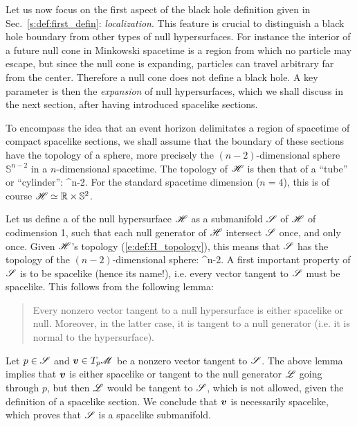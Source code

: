 Let us now focus on the first aspect of the black hole definition given
in Sec.~\ref{s:def:first_defin}: \emph{localization}.
This feature is crucial to distinguish a black hole boundary from other types
of null hypersurfaces. For instance the interior of a future null cone
in Minkowski spacetime is a region from which no particle may escape,
but since the null cone is expanding, particles can travel arbitrary far from
the center. Therefore a null cone does not define a black hole.
A key parameter is then the \emph{expansion} of null hypersurfaces, which we shall
discuss in the next section, after having introduced spacelike sections.

To encompass the idea that an event horizon delimitates a
region of spacetime of compact spacelike sections, we shall assume
that the boundary of these sections have the topology of a sphere, more
precisely the $(n-2)$-dimensional sphere $\mathbb{S}^{n-2}$ in a $n$-dimensional
spacetime. The topology of $\mathscr{H}$ is then that of a ``tube'' or ``cylinder'':
\be \label{e:def:H_topology}
    \Hor \simeq \R \times {}^{n-2}.
\ee
For the standard spacetime dimension ($n=4$), this is of course
$\mathscr{H} \simeq \mathbb{R} \times \mathbb{S}^{2}$.

Let us define a 
of the null hypersurface $\mathscr{H}$
as a submanifold $\mathscr{S}$ of $\mathscr{H}$ of codimension 1,
such that each null generator of $\mathscr{H}$ intersect $\mathscr{S}$ once, and only once.
Given $\mathscr{H}$'s topology (\ref{e:def:H_topology}), this means that $\mathscr{S}$ has the
topology of the $(n-2)$-dimensional sphere:
\be
    \Sp \simeq {}^{n-2}.
\ee
A first important property of $\mathscr{S}$ is to be spacelike (hence its name!),
i.e. every vector
tangent to $\mathscr{S}$ must be spacelike. This follows from the following lemma:
\begin{quote}
Every nonzero vector tangent to a null hypersurface is either spacelike or null.
Moreover, in the latter case, it is tangent to a null generator (i.e. it is normal
to the hypersurface).
\end{quote}
Let $p \in \mathscr{S}$ and $\bm{v}\in T_p\mathscr{M}$ be a nonzero vector tangent to $\mathscr{S}$.
The above lemma implies that $\bm{v}$ is either spacelike or tangent to the
null generator $\mathscr{L}$ going through $p$, but then $\mathscr{L}$ would be tangent to $\mathscr{S}$,
which is not allowed, given the definition of a spacelike section. We conclude
that $\bm{v}$ is necessarily spacelike, which proves that $\mathscr{S}$ is a spacelike
submanifold.

